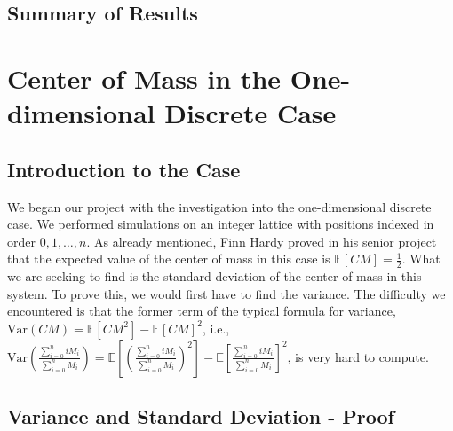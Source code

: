 \documentclass[11pt, twoside, reqno]{book}
\newcommand{\Var}{\text{Var}}
\begin{document}
\section{Summary of Results}
\label{sec5}


\chapter{Center of Mass in the One-dimensional Discrete Case}
\label{chapA}

\section{Introduction to the Case}
\label{secA1}

We began our project with the investigation into the one-dimensional discrete case. We performed simulations on an integer lattice with positions indexed in order $0, 1, \dots , n$. As already mentioned, Finn Hardy proved in his senior project that the expected value of the center of mass in this case is $\mathbb{E} [CM] = \frac{1}{2}$. What we are seeking to find is the standard deviation of the center of mass in this system. To prove this, we would first have to find the variance. The difficulty we encountered is that the former term of the typical formula for variance, $\Var (CM) = \mathbb{E}[CM^{2}] - \mathbb{E}[CM]^{2}$, i.e., $\Var\left(\frac{\sum^{n}_{i=0} iM_{i}}{\sum^{n}_{i=0}M_{i}}\right) = \mathbb{E}\left[\left(\frac{\sum^{n}_{i=0} iM_{i}}{\sum^{n}_{i=0}M_{i}}\right)^{2}\right] - \mathbb{E}\left[\frac{\sum^{n}_{i=0} iM_{i}}{\sum^{n}_{i=0}M_{i}}\right]^{2}$, is very hard to compute. 

\section{Variance and Standard Deviation - Proof}
\label{secA2}
\end{document}
